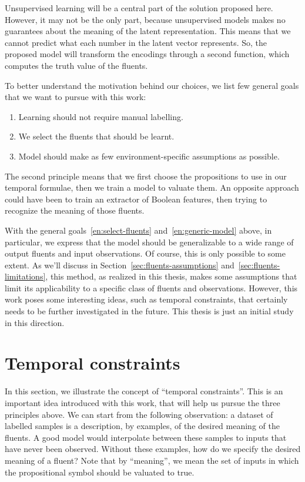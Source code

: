 Unsupervised learning will be a central part of the solution proposed here.
However, it may not be the only part, because unsupervised models makes no
guarantees about the meaning of the latent representation. This means that
we cannot predict what each number in the latent vector represents. So, the
proposed model will transform the encodings through a second function, which
computes the truth value of the fluents.

To better understand the motivation behind our choices, we list few general
goals that we want to pursue with this work:
\begin{enumerate}
	\item Learning should not require manual labelling.
	\item \label{en:select-fluents} We select the fluents that should be learnt.
	\item \label{en:generic-model} Model should make as few environment-specific
		assumptions as possible.
\end{enumerate}
The second principle means that we first choose the propositions to use in our
temporal formulae, then we train a model to valuate them. An opposite approach
could have been to train an extractor of Boolean features, then trying to
recognize the meaning of those fluents.

With the general goals~\ref{en:select-fluents} and~\ref{en:generic-model}
above, in particular, we express that the model should be generalizable to a
wide range of output fluents and input observations. Of course, this is only
possible to some extent. As we'll discuss in
Section~\ref{sec:fluents-assumptions} and~\ref{sec:fluents-limitations}, this
method, as realized in this thesis, makes some assumptions that limit its
applicability to a specific class of fluents and observations. However, this
work poses some interesting ideas, such as temporal constraints, that
certainly needs to be further investigated in the future. This thesis is just
an initial study in this direction.


\section{Temporal constraints}

In this section, we illustrate the concept of ``temporal constraints''. This
is an important idea introduced with this work, that will help us pursue the
three principles above. We can start from the following observation: a dataset
of labelled samples is a description, by examples, of the desired meaning of
the fluents. A good model would interpolate between these samples to inputs
that have never been observed. Without these examples, how do we specify the
desired meaning of a fluent? Note that by ``meaning'', we mean the set of
inputs in which the propositional symbol should be valuated to true.

